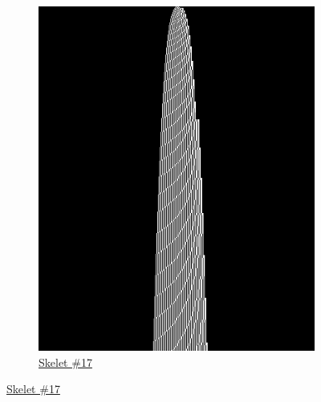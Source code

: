 \begin{figure}[h!]
\begin{minipage}{\textwidth}
\begin{subfigure}{0.3\textwidth}
            \includegraphics[width=\linewidth]{figures/sporadic-machines/sk17.png}
            \caption*{\href{https://bbchallenge.org/1RB---_0LC1RE_0LD1LC_1RA1LB_0RB0RA}{Skelet \#17}}
        \end{subfigure}
    \end{minipage}

    \vspace{1.5em}


\end{figure}
